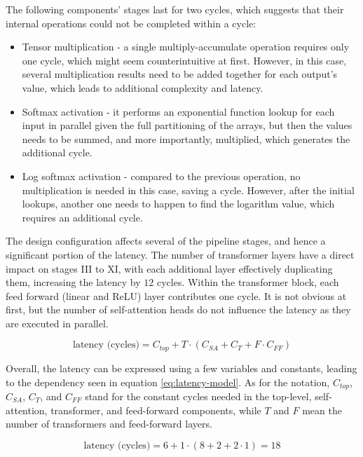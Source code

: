 The following components' stages last for two cycles, which suggests that their internal operations could not be completed within a cycle:

\begin{itemize}
  \item Tensor multiplication - a single multiply-accumulate operation requires only one cycle, which might seem counterintuitive at first. However, in this case, several multiplication results need to be added together for each output's value, which leads to additional complexity and latency.
  \item Softmax activation - it performs an exponential function lookup for each input in parallel given the full partitioning of the arrays, but then the values needs to be summed, and more importantly, multiplied, which generates the additional cycle.
  \item Log softmax activation - compared to the previous operation, no multiplication is needed in this case, saving a cycle. However, after the initial lookups, another one needs to happen to find the logarithm value, which requires an additional cycle.
\end{itemize}

The design configuration affects several of the pipeline stages, and hence a significant portion of the latency. The number of transformer layers  have a direct impact on stages III to XI, with each additional layer effectively duplicating them, increasing the latency by \(12\) cycles. Within the transformer block, each feed forward (linear and ReLU) layer contributes one cycle. It is not obvious at first, but the number of self-attention heads do not influence the latency as they are executed in parallel.

\begin{equation} \label{eq:latency-model}
  \text{latency (cycles)} = C_{top} + T \cdot ( C_{SA} + C_{T} + F \cdot C_{FF} )
\end{equation}

Overall, the latency can be expressed using a few variables and constants, leading to the dependency seen in equation \ref{eq:latency-model}. As for the notation, \(C_{top}\), \(C_{SA}\), \(C_{T}\), and \(C_{FF}\) stand for the constant cycles needed in the top-level, self-attention, transformer, and feed-forward components, while \(T\) and \(F\) mean the number of transformers and feed-forward layers.

\begin{equation} \label{eq:latency-model-numbers}
  \text{latency (cycles)} = 6 + 1 \cdot ( 8 + 2 + 2 \cdot 1 ) = 18
\end{equation}

